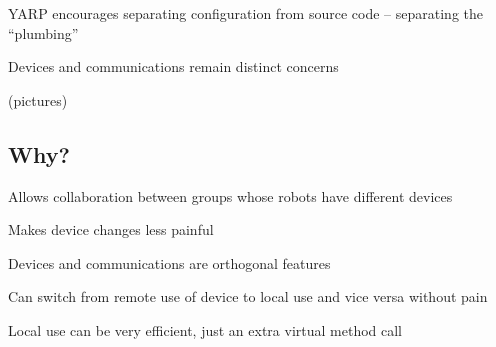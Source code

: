 YARP encourages separating configuration from source code -- separating
the ``plumbing''

Devices and communications remain distinct concerns

(pictures)


\subsection{Why?}

Allows collaboration between groups whose robots have different devices

Makes device changes less painful

Devices and communications are orthogonal features

Can switch from remote use of device to local use and vice versa without pain

Local use can be very efficient, just an extra virtual method call

